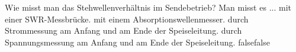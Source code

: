    {Wie misst man das Stehwellenverhältnis im Sendebetrieb? Man misst es ...}
    {mit einer SWR-Messbrücke.}
    {mit einem Absorptionswellenmesser.}
    {durch Strommessung am Anfang und am Ende der Speiseleitung.}
    {durch Spannungsmessung am Anfang und am Ende der Speiseleitung.}
    {false}{false}
